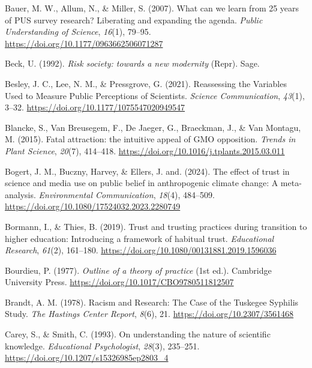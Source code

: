 \documentclass[
  jou,
  floatsintext,
  longtable,
  nolmodern,
  notxfonts,
  notimes,
  colorlinks=true,linkcolor=blue,citecolor=blue,urlcolor=blue]{apa7}
\newlength{\cslhangindent}
\newenvironment{CSLReferences}[2] %
 {\begin{list}{}{%
  \setlength{\itemindent}{0pt}
  \setlength{\leftmargin}{0pt}
  \setlength{\parsep}{0pt}
  \ifodd #1
   \setlength{\leftmargin}{\cslhangindent}
   \setlength{\itemindent}{-1\cslhangindent}
  \fi
  \setlength{\itemsep}{#2\baselineskip}}}
 {\end{list}}
\begin{document}
\begin{CSLReferences}{1}{0}
Bauer, M. W., Allum, N., \& Miller, S. (2007). What can we learn from 25
years of PUS survey research? Liberating and expanding the agenda.
\emph{Public Understanding of Science}, \emph{16}(1), 79--95.
\url{https://doi.org/10.1177/0963662506071287}

Beck, U. (1992). \emph{Risk society: towards a new modernity} (Repr).
Sage.

Besley, J. C., Lee, N. M., \& Pressgrove, G. (2021). Reassessing the
Variables Used to Measure Public Perceptions of Scientists.
\emph{Science Communication}, \emph{43}(1), 3--32.
\url{https://doi.org/10.1177/1075547020949547}

Blancke, S., Van Breusegem, F., De Jaeger, G., Braeckman, J., \& Van
Montagu, M. (2015). Fatal attraction: the intuitive appeal of GMO
opposition. \emph{Trends in Plant Science}, \emph{20}(7), 414--418.
\url{https://doi.org/10.1016/j.tplants.2015.03.011}

Bogert, J. M., Buczny, Harvey, \& Ellers, J. and. (2024). The effect of
trust in science and media use on public belief in anthropogenic climate
change: A meta-analysis. \emph{Environmental Communication},
\emph{18}(4), 484--509.
\url{https://doi.org/10.1080/17524032.2023.2280749}

Bormann, I., \& Thies, B. (2019). Trust and trusting practices during
transition to higher education: Introducing a framework of habitual
trust. \emph{Educational Research}, \emph{61}(2), 161--180.
\url{https://doi.org/10.1080/00131881.2019.1596036}

Bourdieu, P. (1977). \emph{Outline of a theory of practice} (1st ed.).
Cambridge University Press.
\url{https://doi.org/10.1017/CBO9780511812507}

Brandt, A. M. (1978). Racism and Research: The Case of the Tuskegee
Syphilis Study. \emph{The Hastings Center Report}, \emph{8}(6), 21.
\url{https://doi.org/10.2307/3561468}

Carey, S., \& Smith, C. (1993). On understanding the nature of
scientific knowledge. \emph{Educational Psychologist}, \emph{28}(3),
235--251. \url{https://doi.org/10.1207/s15326985ep2803_4}


\end{CSLReferences}
\end{document}
